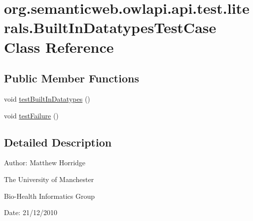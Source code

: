 \hypertarget{classorg_1_1semanticweb_1_1owlapi_1_1api_1_1test_1_1literals_1_1_built_in_datatypes_test_case}{\section{org.\-semanticweb.\-owlapi.\-api.\-test.\-literals.\-Built\-In\-Datatypes\-Test\-Case Class Reference}
\label{classorg_1_1semanticweb_1_1owlapi_1_1api_1_1test_1_1literals_1_1_built_in_datatypes_test_case}
}
\subsection*{Public Member Functions}
\begin{DoxyCompactItemize}
\item 
void \hyperlink{classorg_1_1semanticweb_1_1owlapi_1_1api_1_1test_1_1literals_1_1_built_in_datatypes_test_case_a5e727932d85ef69ecddd5fbba1ed06f5}{test\-Built\-In\-Datatypes} ()
\item 
void \hyperlink{classorg_1_1semanticweb_1_1owlapi_1_1api_1_1test_1_1literals_1_1_built_in_datatypes_test_case_adc57e25c61354b5c8b68e18108cf407e}{test\-Failure} ()
\end{DoxyCompactItemize}


\subsection{Detailed Description}
Author\-: Matthew Horridge\par
 The University of Manchester\par
 Bio-\/\-Health Informatics Group\par
 Date\-: 21/12/2010 

